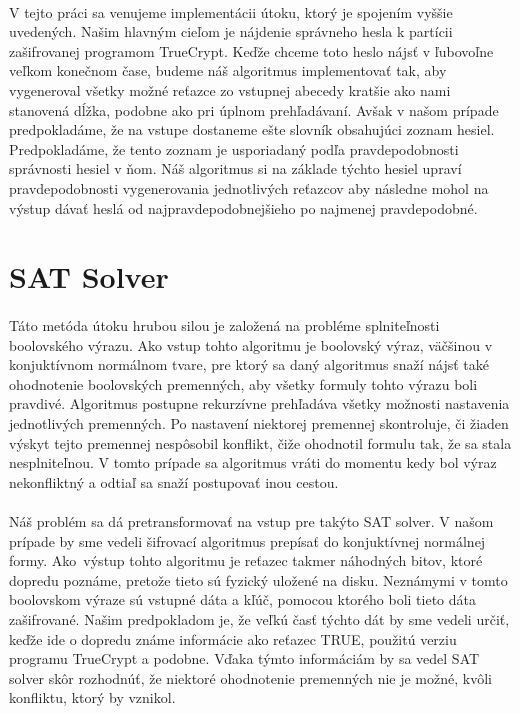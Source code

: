 \paragraph{}
V tejto práci sa venujeme implementácii útoku, ktorý je spojením vyššie uvedených. Našim hlavným cieľom je nájdenie správneho hesla k partícii zašifrovanej programom TrueCrypt. Keďže chceme toto heslo nájsť v ľubovoľne veľkom konečnom čase, budeme náš algoritmus implementovať tak, aby vygeneroval všetky možné reťazce zo vstupnej abecedy kratšie ako nami stanovená dĺžka, podobne ako pri úplnom prehľadávaní. Avšak v našom prípade predpokladáme, že na vstupe dostaneme ešte slovník obsahujúci zoznam hesiel. Predpokladáme, že tento zoznam je usporiadaný podľa pravdepodobnosti správnosti hesiel v ňom. Náš algoritmus si na základe týchto hesiel upraví pravdepodobnosti vygenerovania jednotlivých reťazcov aby následne mohol na výstup dávať heslá od najpravdepodobnejšieho po najmenej pravdepodobné. 

\section{SAT Solver}
\paragraph{}
Táto metóda útoku hrubou silou je založená na probléme splniteľnosti boolovského výrazu. Ako vstup tohto algoritmu je boolovský výraz, väčšinou v konjuktívnom normálnom tvare, pre ktorý sa daný algoritmus snaží nájsť také ohodnotenie boolovských premenných, aby všetky formuly tohto výrazu boli pravdivé. Algoritmus postupne rekurzívne prehľadáva všetky možnosti nastavenia jednotlivých premenných. Po nastavení niektorej premennej skontroluje, či žiaden výskyt tejto premennej nespôsobil konflikt, čiže ohodnotil formulu tak, že sa stala nesplniteľnou. V tomto prípade sa algoritmus vráti do momentu kedy bol výraz nekonfliktný a odtiaľ sa snaží postupovať inou cestou.

\paragraph{}
Náš problém sa dá pretransformovať na vstup pre takýto SAT solver. V našom prípade by sme vedeli šifrovací algoritmus prepísať do konjuktívnej normálnej formy. Ako~výstup tohto algoritmu je reťazec takmer náhodných bitov, ktoré dopredu poznáme, pretože tieto sú fyzický uložené na disku. Neznámymi v tomto boolovskom výraze sú vstupné dáta a kľúč, pomocou ktorého boli tieto dáta zašifrované. Našim predpokladom je, že veľkú časť týchto dát by sme vedeli určiť, keďže ide o dopredu známe informácie ako reťazec TRUE, použitú verziu programu TrueCrypt a podobne. Vďaka týmto informáciám by sa vedel SAT solver skôr rozhodnúť, že niektoré ohodnotenie premenných nie je možné, kvôli konfliktu, ktorý by vznikol.


